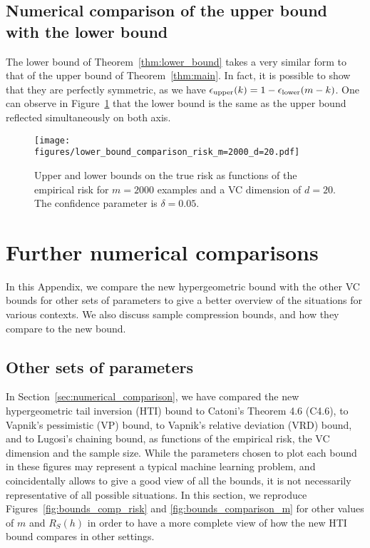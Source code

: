 \documentclass[twoside,11pt]{article}
\begin{document}
\subsection{Numerical comparison of the upper bound with the lower bound}
\label{app:comp_upper_lower}

The lower bound of Theorem~\ref{thm:lower_bound} takes a very similar form to that of the upper bound of Theorem~\ref{thm:main}.
In fact, it is possible to show that they are perfectly symmetric, as we have $\epsilon_\textnormal{upper}(k) = 1 - \epsilon_\textnormal{lower}(m-k)$.
One can observe in Figure~\ref{fig:lower_upper_bounds_comp} that the lower bound is the same as the upper bound reflected simultaneously on both axis.


\begin{figure}[h]
    \centering
    \texttt{[image: figures/lower\_bound\_comparison\_risk\_m=2000\_d=20.pdf]}
    \caption{Upper and lower bounds on the true risk as functions of the empirical risk for $m=2000$ examples and a VC dimension of $d=20$. The confidence parameter is $\delta=0.05$.}
    \label{fig:lower_upper_bounds_comp}
\end{figure}











\clearpage

\section{Further numerical comparisons}
\label{app:further_numerical_comparisons}

In this Appendix, we compare the new hypergeometric bound with the other VC bounds for other sets of parameters to give a better overview of the situations for various contexts.
We also discuss sample compression bounds, and how they compare to the new bound.

\subsection{Other sets of parameters}
\label{ssec:other_numerical_settings}

In Section~\ref{sec:numerical_comparison}, we have compared the new hypergeometric tail inversion (HTI) bound to Catoni's Theorem 4.6 (C4.6), to Vapnik's pessimistic (VP) bound, to Vapnik's relative deviation (VRD) bound, and to Lugosi's chaining bound, as functions of the empirical risk, the VC dimension and the sample size.
While the parameters chosen to plot each bound in these figures may represent a typical machine learning problem, and coincidentally allows to give a good view of all the bounds, it is not necessarily representative of all possible situations.
In this section, we reproduce Figures~\ref{fig:bounds_comp_risk} and \ref{fig:bounds_comparison_m} for other values of $m$ and $R_S(h)$ in order to have a more complete view of how the new HTI bound compares in other settings.
\end{document}
